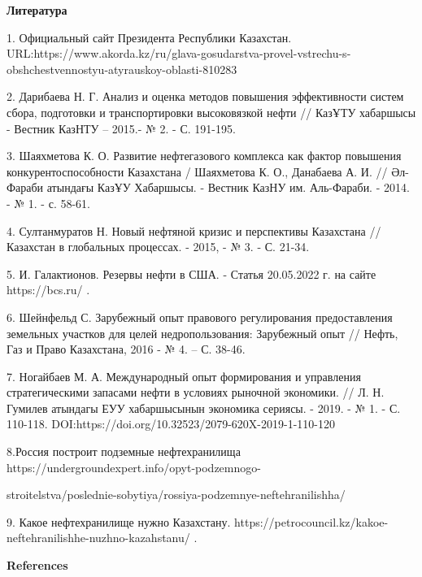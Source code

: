 \begin{center}
{\bfseries Литература}
\end{center}


\begin{noparindent}
1.
Официальный сайт Президента Республики Казахстан.
URL:https://www.akorda.kz/ru/glava-gosudarstva-provel-vstrechu-s-obshchestvennostyu-atyrauskoy-oblasti-810283

2.
Дарибаева Н. Г. Анализ и оценка методов повышения эффективности систем
сбора, подготовки и транспортировки высоковязкой нефти // КазҰТУ
хабаршысы - Вестник КазНТУ -- 2015.- № 2. - С. 191-195.

3.
Шаяхметова К. О. Развитие нефтегазового комплекса как фактор повышения
конкурентоспособности Казахстана / Шаяхметова К. О., Данабаева А. И.
// Әл-Фараби атындағы КазҰУ Хабаршысы. - Вестник КазНУ им. Аль-Фараби.
- 2014. - № 1. - с. 58-61.

4.
Султанмуратов Н. Новый нефтяной кризис и перспективы Казахстана //
Казахстан в глобальных процессах. - 2015, - № 3. - С. 21-34.

5.
И. Галактионов. Резервы нефти в США. - Статья 20.05.2022 г. на сайте
https://bcs.ru/ .

6.
Шейнфельд С. Зарубежный опыт правового регулирования предоставления
земельных участков для целей недропользования: Зарубежный опыт //
Нефть, Газ и Право Казахстана, 2016 - № 4. -- С. 38-46.

7.
Ногайбаев М. А. Международный опыт формирования и управления
стратегическими запасами нефти в условиях рыночной экономики. // Л. Н.
Гумилев атындагы ЕУУ хабаршысынын экономика сериясы. - 2019. - № 1. -
С. 110-118. DOI:https://doi.org/10.32523/2079-620X-2019-1-110-120

8.Россия построит подземные нефтехранилища
https://undergroundexpert.info/opyt-podzemnogo-

stroitelstva/poslednie-sobytiya/rossiya-podzemnye-neftehranilishha/

9. Какое нефтехранилище нужно Казахстану.
https://petrocouncil.kz/kakoe-neftehranilishhe-nuzhno-kazahstanu/ .
\end{noparindent}

\begin{center}
{\bfseries References}
\end{center}

